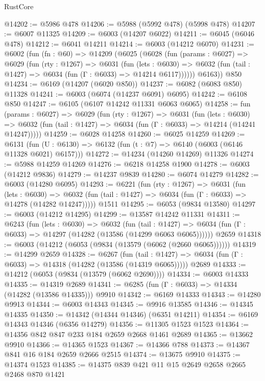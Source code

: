 \begin{lexlean}{RustCore}
\begin{coremodule}
@14202 := @5986 @478
@14206 := @5988 (@5992 @478) (@5998 @478)
@14207 := @6007 @11325
@14209 := @6003 (@14207 @6022)
@14211 := @6045 (@6046 @478)
@14212 := @6041 @14211
@14214 := @6003 (@14212 @6070)
@14231 := @6002
    (fun (fn : @60) =>
    @14209
      (@6025
        (@6028
          (fun (params : @6027) =>
          @6029
            (fun (rty : @1267) =>
            @6031
              (fun (lets : @6030) =>
              @6032 (fun (tail : @1427) => @6034 (fun (Γ : @6033) => @14214 @6117))))))
        @6163))
    @850
@14234 := @6169 (@14207 (@6020 @850))
@14237 := @6082 (@6083 @850) @11328
@14241 := @6003 (@6074 (@14237 @6091) @6095)
@14242 := @6108 @850
@14247 := @6105 (@6107 @14242 @11331 @6063 @6065)
@14258 := fun (params : @6027) =>
  @6029
    (fun (rty : @1267) =>
    @6031
      (fun (lets : @6030) =>
      @6032 (fun (tail : @1427) => @6034 (fun (Γ : @6033) => @14214 (@14241 @14247)))))
@14259 := @6028 @14258
@14260 := @6025 @14259
@14269 := @6131
    (fun (U : @6130) => @6132 (fun (t : @7) => @6140 (@6003 (@6146 @11328 @6021) @6157)))
@14272 := @14234 (@14260 @14269) @11326
@14274 := @5988 @14259 @14269
@14276 := @6218 @14258 @1900
@14278 := @6003 (@14212 @9836)
@14279 := @14237 @9839
@14280 := @6074 @14279
@14282 := @6003 (@14280 @6095)
@14293 := @6221
    (fun (rty : @1267) =>
    @6031
      (fun (lets : @6030) =>
      @6032 (fun (tail : @1427) => @6034 (fun (Γ : @6033) => @14278 (@14282 @14247)))))
    @1511
@14295 := @6053 (@9834 @13580)
@14297 := @6003 (@14212 @14295)
@14299 := @13587 @14242 @11331
@14311 := @6243
    (fun (lets : @6030) =>
    @6032
      (fun (tail : @1427) =>
      @6034 (fun (Γ : @6033) => @14297 (@14282 (@13586 (@14299 @6063 @6065))))))
    @2659
@14318 := @6003 (@14212 (@6053 (@9834 (@13579 (@6062 (@2660 @6065))))))
@14319 := @14299 @2659
@14328 := @6267
    (fun (tail : @1427) => @6034 (fun (Γ : @6033) => @14318 (@14282 (@13586 (@14319 @6065)))))
    @2689
@14333 := @14212 (@6053 (@9834 (@13579 (@6062 @2690))))
@14334 := @6003 @14333
@14335 := @14319 @2689
@14341 := @6285 (fun (Γ : @6033) => @14334 (@14282 (@13586 @14335))) @9910
@14342 := @6169 @14333
@14343 := @14280 @9913
@14344 := @6003 @14343
@14345 := @9916 @13585
@14346 := @14345 @14335
@14350 := @14342 (@14344 @14346) (@6351 @14211)
@14354 := @6169 @14343 @14346 (@6356 @14279)
@14356 := @11305 @1523 @1523
@14364 := @14356 @842 @847 @233 @184 @2659 @2668 @1461 @2689
@14365 := @13662 @9910
@14366 := @14365 @1523
@14367 := @14366 @788
@14373 := @14367 @841 @16 @184 @2659 @2666 @2515
@14374 := @13675 @9910
@14375 := @14374 @1523
@14385 := @14375 @839 @421 @11 @15 @2649 @2658 @2665 @2468 @870 @1421

\end{coremodule}
\end{lexlean}
